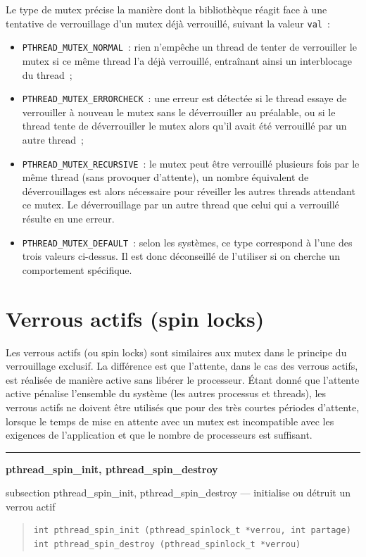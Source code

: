 \documentclass [twoside] {report}
\newcommand {\primitive} [1]
    {
	\phantomsection
	{\large \textbf {#1}}
	\addcontentsline {toc} {subsection} {#1}
    }
\newcommand {\separation}
    {
	\vspace {5mm}
	\nopagebreak
	\hrule
    }
\begin{document}
Le type de mutex précise la manière dont la bibliothèque réagit
face à une tentative de verrouillage d'un mutex déjà verrouillé,
suivant la valeur \texttt {val}~:

\begin {itemize}
    \item \verb|PTHREAD_MUTEX_NORMAL|~: rien n'empêche un thread
	de tenter de verrouiller le mutex si ce même thread l'a déjà
	verrouillé, entraînant ainsi un interblocage du thread~;
    \item \verb|PTHREAD_MUTEX_ERRORCHECK|~: une erreur est détectée
	si le thread essaye de verrouiller à nouveau le mutex sans le
	déverrouiller au préalable, ou si le thread tente de
	déverrouiller le mutex alors qu'il avait été verrouillé par un
	autre thread~;
    \item \verb|PTHREAD_MUTEX_RECURSIVE|~: le mutex peut être verrouillé
	plusieurs fois par le même thread (sans provoquer d'attente),
	un nombre équivalent de déverrouillages est alors nécessaire
	pour réveiller les autres threads attendant ce mutex. Le
	déverrouillage par un autre thread que celui qui a verrouillé
	résulte en une erreur.
    \item \verb|PTHREAD_MUTEX_DEFAULT|~: selon les systèmes, ce type
	correspond à l'une des trois valeurs ci-dessus. Il est donc
	déconseillé de l'utiliser si on cherche un comportement
	spécifique.
\end {itemize}


\section {Verrous actifs (spin locks)}

Les verrous actifs (ou spin locks) sont similaires aux mutex dans le
principe du verrouillage exclusif. La différence est que l'attente,
dans le cas des verrous actifs, est réalisée de manière active sans
libérer le processeur. Étant donné que l'attente active pénalise
l'ensemble du système (les autres processus et threads), les verrous
actifs ne doivent être utilisés que pour des très courtes périodes
d'attente, lorsque le temps de mise en attente avec un mutex est
incompatible avec les exigences de l'application et que le nombre de
processeurs est suffisant.

\separation
\primitive {pthread\_spin\_init, pthread\_spin\_destroy} --- initialise ou détruit un verrou actif

\begin {quote}
\begin {verbatim}
int pthread_spin_init (pthread_spinlock_t *verrou, int partage)
int pthread_spin_destroy (pthread_spinlock_t *verrou)
\end{verbatim}
\end {quote}
\end{document}
